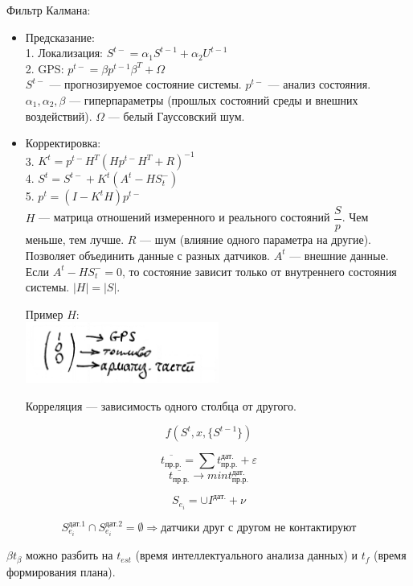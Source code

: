 \documentclass[12pt]{article}
\begin{document}
Фильтр Калмана:
\begin{itemize}
    \item Предсказание: \\
          1. Локализация: $S^{t-} = \alpha_1 S^{t-1} + \alpha_2 U^{t - 1}$ \\
          2. GPS: $p^{t-} = \beta p^{t - 1} \beta^T + \Omega$ \\
          $S^{t-}$ — прогнозируемое состояние системы. $p^{t-}$ — анализ состояния. $\alpha_1, \alpha_2, \beta$ — гиперпараметры (прошлых состояний среды и внешних воздействий). $\Omega$ — белый Гауссовский шум.
    \item Корректировка: \\
          3. $K^t = p^{t-} H^T(Hp^{t-}H^T + R)^{-1}$ \\
          4. $S^t = S^{t-} + K^t(A^t - H S_t^-)$ \\
          5. $p^t = (I - K^tH)p^{t-}$ \\
          $H$ — матрица отношений измеренного и реального состояний $\dfrac{S}{p}$. Чем меньше, тем лучше. $R$ — шум (влияние одного параметра на другие). Позволяет объединить данные с разных датчиков. $A^t$ — внешние данные. Если $A^t - HS_t^- = 0$, то состояние зависит только от внутреннего состояния системы. $|H| = |S|$.

          Пример $H$: \\
          \includegraphics[width=0.5\textwidth]{graphics/pic04.png}

          Корреляция — зависимость одного столбца от другого.
\end{itemize}

\[
    f(S^t, x, \{S^{t - 1}\})
\]

\[
    \overline{t_\text{пр.р.}} = \sum t_\text{пр.р.}^\text{дат.} + \varepsilon
\]
\[
    \overline{t_\text{пр.р.}} \rightarrow min t_\text{пр.р.}^\text{дат.}
\]

\[
    S_{e_i} = \cup I^\text{дат.} + \nu
\]

\[
    S_{e_i}^\text{дат.1} \cap S_{e_i}^\text{дат.2} = \emptyset \Rightarrow \text{датчики друг с другом не контактируют}
\]

$\beta t_\beta$ можно разбить на $t_{est}$ (время интеллектуального анализа данных) и $t_f$ (время формирования плана).
\end{document}
